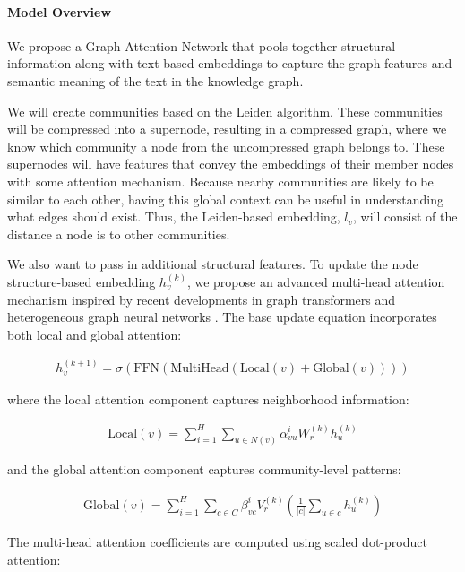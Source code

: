 \documentclass{article}
\begin{document}
\paragraph{Model Overview}
We propose a Graph Attention Network that pools together structural information along with text-based embeddings to capture the graph features and semantic meaning of the text in the knowledge graph.

We will create communities based on the Leiden algorithm. These communities will be compressed into a supernode, resulting in a compressed graph, where we know which community a node from the uncompressed graph belongs to. These supernodes will have features that convey the embeddings of their member nodes with some attention mechanism. Because nearby communities are likely to be similar to each other, having this global context can be useful in understanding what edges should exist. Thus, the Leiden-based embedding, $l_v$, will consist of the distance a node is to other communities.

We also want to pass in additional structural features. To update the node structure-based embedding $h_v^{(k)}$, we propose an advanced multi-head attention mechanism inspired by recent developments in graph transformers and heterogeneous graph neural networks \cite{hu2020heterogeneous, yun2019graph}. The base update equation incorporates both local and global attention:

\begin{align}
    h_v^{(k+1)} = \sigma \left( \text{FFN}\left(\text{MultiHead}\left(\text{Local}(v) + \text{Global}(v)\right)\right) \right)
\end{align}

where the local attention component captures neighborhood information:

\begin{align}
    \text{Local}(v) = \sum_{i=1}^H \sum_{u \in N(v)} \alpha_{vu}^i W_r^{(k)} h_u^{(k)}
\end{align}

and the global attention component captures community-level patterns:

\begin{align}
    \text{Global}(v) = \sum_{i=1}^H \sum_{c \in C} \beta_{vc}^i V_r^{(k)} \left(\frac{1}{|c|}\sum_{u \in c} h_u^{(k)}\right)
\end{align}

The multi-head attention coefficients are computed using scaled dot-product attention:
\end{document}
